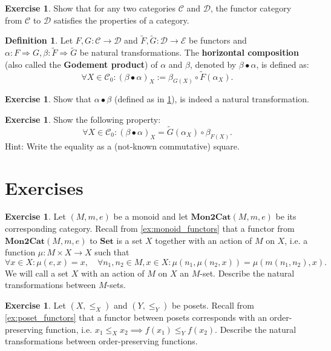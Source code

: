 \documentclass[a4paper,11pt, oneside,titlepage=false]{scrbook}
\theoremstyle{plain}
\theoremstyle{definition}
\newtheorem{dfn}[thm]{Definition}
\newtheorem{exer}[thm]{Exercise}
\newcommand{\Cat}[1]{\mathcal{#1}}
\newcommand{\CC}{\Cat{C}}
\newcommand{\DD}{\Cat{D}}
\newcommand{\EE}{\Cat{E}}
\newcommand{\Catb}[1]{\mathbf{#1}}
\newcommand{\SET}{\Catb{Set}}
\newcommand{\MONtoCAT}{\Catb{Mon2Cat}}
\newcommand{\Ob}[1]{{#1}_0}
\newcommand{\NatTrans}[3]{#1 : #2 \Rightarrow #3}
\newcommand{\co}[2]{\ensuremath{#2 \circ #1}}
\begin{document}
\begin{exer} Show that for any two categories $\CC$ and $\DD$, the functor category from $\CC$ to $\DD$ satisfies the properties of a category.
\end{exer}

\begin{dfn}\label{dfn:nattrans_horcomp} Let $F,G : \CC\to\DD$ and $\tilde{F},\tilde{G}:\DD\to\EE$ be functors and $\NatTrans{\alpha}{F}{G}, \NatTrans{\beta}{\tilde{F}}{\tilde{G}}$ be natural transformations. The \textbf{horizontal composition} (also called the \textbf{Godement product}) of $\alpha$ and $\beta$, denoted by $\beta \bullet \alpha$, is defined as:
\begin{equation}\label{eqn:nattrans_horcomp}
\forall X\in \Ob{\CC}: (\beta\bullet\alpha)_X := \co{\tilde{F}(\alpha_X)}{\beta_{G(X)}}.
\end{equation}
\end{dfn}

\begin{exer} Show that $\alpha\bullet\beta$ (defined as in \cref{dfn:nattrans_horcomp}), is indeed a natural transformation.
\end{exer}

\begin{exer} Show the following property: 
\[
\forall X\in \Ob{\CC}: (\beta\bullet\alpha)_X = \co{\beta_{F(X)}}{\tilde{G}(\alpha_X)}.
\]
Hint: Write the equality as a (not-known commutative) square.
\end{exer}

\section{Exercises}
\begin{exer}
  Let $(M,m,e)$ be a monoid and let $\MONtoCAT(M,m,e)$ be its corresponding category. Recall from \cref{ex:monoid_functors} that a functor from $\MONtoCAT(M,m,e)$ to $\SET$ is a set $X$ together with an action of $M$ on $X$, i.e. a function $\mu: M\times X\to X$ such that 
  \[
    \forall x\in X: \mu(e,x) = x, \quad \forall n_1,n_2\in M, x\in X: \mu(n_1, \mu(n_2,x)) = \mu(m(n_1,n_2), x).
  \]
  We will call a set $ X $ with an action of $ M $ on $ X $ an $ M $-set.
  Describe the natural transformations between $M$-sets.
\end{exer}

\begin{exer}
  Let $(X,\leq_X)$ and $(Y,\leq_Y)$ be posets.
  Recall from \cref{ex:poset_functors} that a functor between posets corresponds with an order-preserving function, i.e. $x_1 \leq_X x_2 \implies f(x_1) \leq_Y f(x_2)$.
  Describe the natural transformations between order-preserving functions.
\end{exer}
\end{document}
